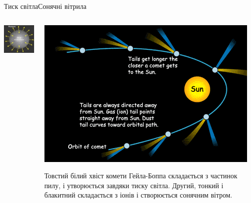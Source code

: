 \documentclass[onlytextwidth]{beamer}
\begin{document}
\begin{frame}{Тиск світла}{Сонячні вітрила}
\begin{onlyenv}
\begin{columns}
\begin{column}{0.5\linewidth}
				\includegraphics[width=0.75\linewidth]{Star}
			\end{column}
			\begin{column}{0.5\linewidth}\centering
				\includegraphics[width=0.75\linewidth]{Comet}

				\begin{block}{}\tiny\centering
					Товстий білий хвіст комети Гейла-Боппа складається з частинок пилу, і утворюється завдяки тиску світла. Другий, тонкий і блакитний складається з іонів і створюється сонячним вітром.
				\end{block}
			\end{column}
		\end{columns}
	\end{onlyenv}
\end{frame}
\end{document}
